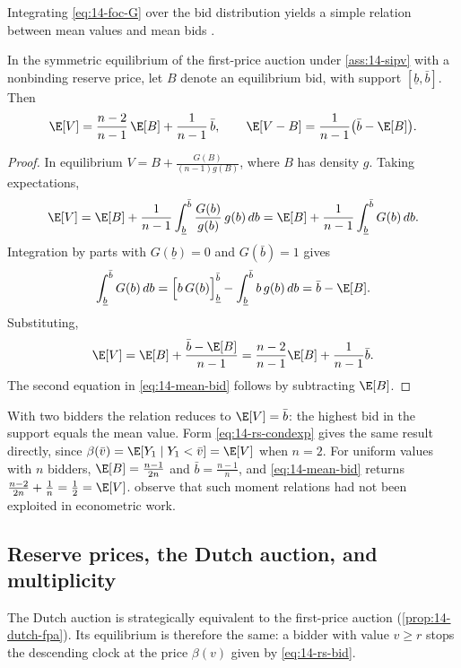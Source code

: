 Integrating \eqref{eq:14-foc-G} over the bid distribution yields a simple relation between mean values and mean bids \citep[Section 2.2.1]{AtheyHaile2007}.

\begin{proposition}\label{prop:14-mean-bid}
In the symmetric equilibrium of the first-price auction under \cref{ass:14-sipv} with a nonbinding reserve price, let $B$ denote an equilibrium bid, with support $[\underline b,\bar b]$. Then
\begin{equation}\label{eq:14-mean-bid}
\E[V]=\frac{n-2}{n-1}\,\E[B]+\frac{1}{n-1}\,\bar b,\qquad \E[V-B]=\frac{1}{n-1}\big(\bar b-\E[B]\big).
\end{equation}
\end{proposition}

\begin{proof}
In equilibrium $V=B+\frac{G(B)}{(n-1)g(B)}$, where $B$ has density $g$. Taking expectations,
\[
\E[V]=\E[B]+\frac{1}{n-1}\int_{\underline b}^{\bar b}\frac{G(b)}{g(b)}\,g(b)\,db=\E[B]+\frac{1}{n-1}\int_{\underline b}^{\bar b}G(b)\,db.
\]
Integration by parts with $G(\underline b)=0$ and $G(\bar b)=1$ gives
\[
\int_{\underline b}^{\bar b}G(b)\,db=\Big[b\,G(b)\Big]_{\underline b}^{\bar b}-\int_{\underline b}^{\bar b}b\,g(b)\,db=\bar b-\E[B].
\]
Substituting,
\[
\E[V]=\E[B]+\frac{\bar b-\E[B]}{n-1}=\frac{n-2}{n-1}\E[B]+\frac{1}{n-1}\bar b.
\]
The second equation in \eqref{eq:14-mean-bid} follows by subtracting $\E[B]$.
\end{proof}

With two bidders the relation reduces to $\E[V]=\bar b$: the highest bid in the support equals the mean value. Form \eqref{eq:14-rs-condexp} gives the same result directly, since $\beta(\bar v)=\E[Y_1\mid Y_1<\bar v]=\E[V]$ when $n=2$. For uniform values with $n$ bidders, $\E[B]=\frac{n-1}{2n}$ and $\bar b=\frac{n-1}{n}$, and \eqref{eq:14-mean-bid} returns $\frac{n-2}{2n}+\frac{1}{n}=\frac12=\E[V]$.  observe that such moment relations had not been exploited in econometric work.

\subsection{Reserve prices, the Dutch auction, and multiplicity}\label{sec:14-fpa-multiplicity}

The Dutch auction is strategically equivalent to the first-price auction (\cref{prop:14-dutch-fpa}). Its equilibrium is therefore the same: a bidder with value $v\ge r$ stops the descending clock at the price $\beta(v)$ given by \eqref{eq:14-rs-bid}.

